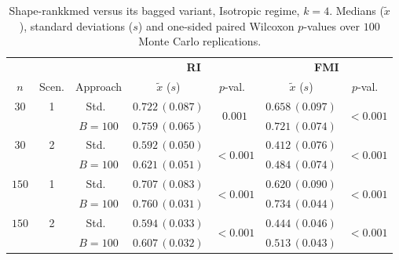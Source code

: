 \begin{table}[h]
\centering
\caption{Shape-rankkmed versus its bagged variant, Isotropic regime, $k=4$. Medians ($\tilde x$), standard deviations ($s$) and one-sided paired Wilcoxon $p$-values over $100$ Monte Carlo replications.}
\label{tab:rkm-iso-k4}
\footnotesize
\begin{tabular}{cc c cc cc}
\toprule
& & & \multicolumn{2}{c}{\textbf{RI}} & \multicolumn{2}{c}{\textbf{FMI}} \\
\cmidrule(lr){4-5}\cmidrule(lr){6-7}
$n$ & Scen. & Approach & $\tilde x$ ($s$) & $p$-val.\ & $\tilde x$ ($s$) & $p$-val.\ \\
\midrule
$30$ & 1 & Std.\ & $0.722\,(0.087)$ & \multirow{2}{*}{$\mathbf{0.001}$} & $0.658\,(0.097)$ & \multirow{2}{*}{$\mathbf{<\!0.001}$} \\
     &   & $B{=}100$ & $0.759\,(0.065)$ & & $0.721\,(0.074)$ & \\
$30$ & 2 & Std.\ & $0.592\,(0.050)$ & \multirow{2}{*}{$\mathbf{<\!0.001}$} & $0.412\,(0.076)$ & \multirow{2}{*}{$\mathbf{<\!0.001}$} \\
     &   & $B{=}100$ & $0.621\,(0.051)$ & & $0.484\,(0.074)$ & \\
$150$ & 1 & Std.\ & $0.707\,(0.083)$ & \multirow{2}{*}{$\mathbf{<\!0.001}$} & $0.620\,(0.090)$ & \multirow{2}{*}{$\mathbf{<\!0.001}$} \\
     &   & $B{=}100$ & $0.760\,(0.031)$ & & $0.734\,(0.044)$ & \\
$150$ & 2 & Std.\ & $0.594\,(0.033)$ & \multirow{2}{*}{$\mathbf{<\!0.001}$} & $0.444\,(0.046)$ & \multirow{2}{*}{$\mathbf{<\!0.001}$} \\
     &   & $B{=}100$ & $0.607\,(0.032)$ & & $0.513\,(0.043)$ & \\
\bottomrule
\end{tabular}
\end{table}

